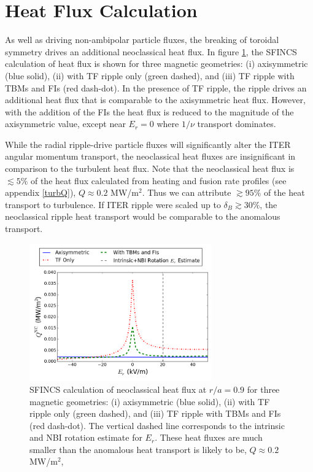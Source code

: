 \documentclass[aip, pop, preprint]{revtex4-1}
\numberwithin{figure}{section}
\numberwithin{equation}{section}
\begin{document}
\FloatBarrier

\section{Heat Flux Calculation}\label{heatflux}
As well as driving non-ambipolar particle fluxes, the breaking of toroidal symmetry drives an additional neoclassical heat flux. In figure \ref{fig:HeatFlux}, the SFINCS calculation of heat flux is shown for three magnetic geometries: (i) axisymmetric (blue solid), (ii) with TF ripple only (green dashed), and (iii) TF ripple with TBMs and FIs (red dash-dot). In the presence of TF ripple, the ripple drives an additional heat flux that is comparable to the axisymmetric heat flux. However, with the addition of the FIs the heat flux is reduced to the magnitude of the axisymmetric value, except near $E_r = 0$ where $1/\nu$ transport dominates. 

While the radial ripple-drive particle fluxes will significantly alter the ITER angular momentum transport, the neoclassical heat fluxes are insignificant in comparison to the turbulent heat flux. Note that the neoclassical heat flux is $\lesssim 5\%$  of the heat flux calculated from heating and fusion rate profiles (see appendix \ref{turbQ}), $Q\approx 0.2$ MW/m$^2$. Thus we can attribute $\gtrsim 95\%$ of the heat transport to turbulence. If ITER ripple were scaled up to $\delta_B \gtrsim 30\%$, the neoclassical ripple heat transport would be comparable to the anomalous transport.

\begin{figure}[h!]
\centering
\includegraphics[width=0.7\textwidth]
{HeatFlux.png}
\caption{\label{fig:HeatFlux} SFINCS calculation of neoclassical heat flux at $r/a = 0.9$ for three magnetic geometries: (i) axisymmetric (blue solid), (ii) with TF ripple only (green dashed), and (iii) TF ripple with TBMs and FIs (red dash-dot). The vertical dashed line corresponds to the intrinsic and NBI rotation estimate for $E_r$. These heat fluxes are much smaller than the anomalous heat transport is likely to be, $Q\approx 0.2$ MW/m$^2$,}
\end{figure}
\end{document}
